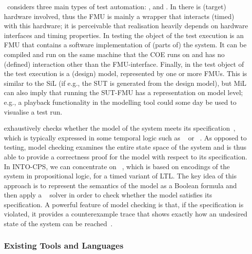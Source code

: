 \into\ considers three main types of test automation: ,  and . In  there is (target) hardware involved, thus the FMU is mainly a wrapper that interacts (timed) with this hardware; it is perceivable that realisation heavily depends on hardware interfaces and timing properties.
In  testing the object of the test execution is an FMU that contains a software implementation of (parts of) the system. It can be compiled and run on the same machine that the COE runs on and has no (defined) interaction other than the FMU-interface.
Finally, in  the test object of the test execution is a (design) model, represented by one or more FMUs. This is similar to the SiL (if e.g., the SUT is generated from the design model), but MiL can also imply that running the SUT-FMU has a representation on model level; e.g., a playback functionality in the modelling tool could some day be used to visualise a test run.

 exhaustively checks whether the model of the system meets its specification~\cite{Clarke&99}, which is typically expressed in some temporal logic such as ~\cite{Pnueli77} or ~\cite{Clarke&81}. As opposed to testing, model checking examines the entire state space of the system and is thus able to provide a correctness proof for the model with respect to its specification. In INTO-CPS, we can concentrate on ~\cite{Clarke&01,Clarke&04,Clarke&05}, which is based on encodings of the system in propositional logic, for a timed variant of LTL. The key idea of this approach is to represent the semantics of the model as a Boolean formula and then apply a ~\cite{Kroening&08} solver in order to check whether the model satisfies its specification. A powerful feature of model checking is that, if the specification is violated, it provides a counterexample trace that shows exactly how an undesired state of the system can be reached~\cite{Clarke&03}.

\subsubsection{Existing Tools and Languages}
\label{sec:concepts:language}

